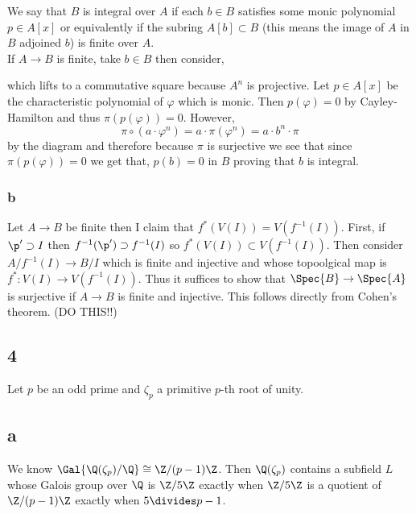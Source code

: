 \documentclass[12pt]{article}
\begin{document}
We say that $B$ is integral over $A$ if each $b \in B$ satisfies some monic polynomial $p \in A[x]$ or equivalently if the subring $A[b] \subset B$ (this means the image of $A$ in $B$ adjoined $b$) is finite over $A$.
\bigskip\\
If $A \to B$ is finite, take $b \in B$ then consider,
\begin{center}
\end{center}
which lifts to a commutative square because $A^n$ is projective. Let $p \in A[x]$ be the characteristic polynomial of $\varphi$ which is monic. Then $p(\varphi) = 0$ by Cayley-Hamilton and thus $\pi(p(\varphi)) = 0$. However,
\[ \pi \circ (a \cdot \varphi^n) = a \cdot \pi(\varphi^n) = a \cdot b^n \cdot \pi \]
by the diagram and therefore because $\pi$ is surjective we see that since $\pi(p(\varphi)) = 0$ we get that, $p(b) = 0$ in $B$ proving that $b$ is integral.

\subsubsection{b}

Let $A \to B$ be finite then I claim that $f^*(V(I)) = V(f^{-1}(I))$. First, if $\p' \supset I$ then $f^{-1}(\p') \supset f^{-1}(I)$ so $f^*(V(I)) \subset V(f^{-1}(I))$. Then consider $A / f^{-1}(I) \to B / I$ which is finite and injective and whose topoolgical map is $f^* : V(I) \to V(f^{-1}(I))$. Thus it suffices to show that $\Spec{B} \to \Spec{A}$ is surjective if $A \to B$ is finite and injective. This follows directly from Cohen's theorem. (DO THIS!!)

\subsection{4}

Let $p$ be an odd prime and $\zeta_p$ a primitive $p$-th root of unity.

\subsection{a}

We know $\Gal{\Q(\zeta_p)/\Q} \cong \Z / (p-1) \Z$. Then $\Q(\zeta_p)$ contains a subfield $L$ whose Galois group over $\Q$ is $\Z / 5 \Z$ exactly when $\Z / 5 \Z$ is a quotient of $\Z / (p-1) \Z$ exactly when $5 \divides p - 1$.
\end{document}
